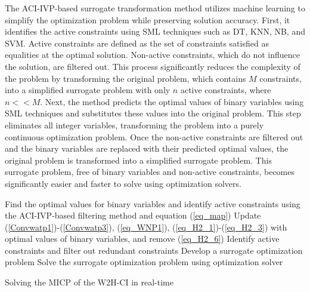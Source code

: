 \documentclass[conference]{IEEEtran}
\begin{document}
The ACI-IVP-based surrogate transformation method utilizes machine learning to simplify the optimization problem while preserving solution accuracy. First, it identifies the active constraints using SML techniques such as DT, KNN, NB, and SVM. Active constraints are defined as the set of constraints satisfied as equalities at the optimal solution. Non-active constraints, which do not influence the solution, are filtered out. This process significantly reduces the complexity of the problem by transforming the original problem, which contains $M$ constraints, into a simplified surrogate problem with only $n$ active constraints, where $n << M$. Next, the method predicts the optimal values of binary variables using SML techniques and substitutes these values into the original problem. This step eliminates all integer variables, transforming the problem into a purely continuous optimization problem.
Once the non-active constraints are filtered out and the binary variables are replaced with their predicted optimal values, the original problem is transformed into a simplified surrogate problem. This surrogate problem, free of binary variables and non-active constraints, becomes significantly easier and faster to solve using optimization solvers. 
\begin{algorithm}[t!]
\footnotesize
\SetAlgoLined
{}

Find the optimal values for binary variables and identify active constraints using the ACI-IVP-based filtering method and equation (\ref{eq_map})\;
Update (\ref{Convwatp1})-(\ref{Convwatp3}), (\ref{eq_WNP1}), (\ref{eq_H2_1})-(\ref{eq_H2_3}) with optimal values of binary variables, and remove (\ref{eq_H2_6})\;
Identify active constraints and filter out redundant constraints\;
Develop a surrogate optimization problem\;
Solve the surrogate optimization problem using optimization solver\;

\caption{\footnotesize Solving the MICP of the W2H-CI in real-time}
\label{alg: CSTmeth}
\end{algorithm}
\end{document}
